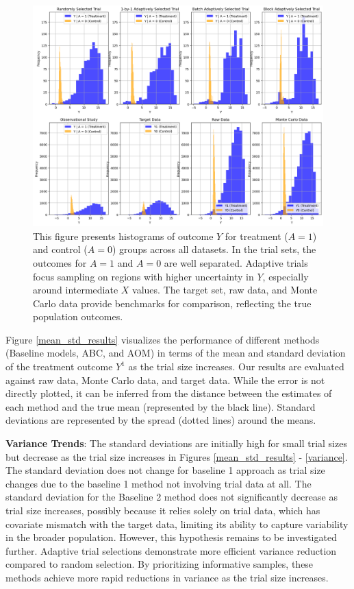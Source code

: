 \documentclass[12pt, oneside]{amsart}
\theoremstyle{definition}
\theoremstyle{remark}
\numberwithin{equation}{section}
\begin{document}
\begin{figure}[hbt!]
    \centering
    \includegraphics[scale=0.3]{Report/Figure/YvsA.jpg}
    \caption{This figure presents histograms of outcome $Y$ for treatment ($A=1$) and control ($A=0$) groups across all datasets. In the trial sets, the outcomes for $A=1$ and $A=0$ are well separated. Adaptive trials focus sampling on regions with higher uncertainty in $Y$, especially around intermediate $X$ values. The target set, raw data, and Monte Carlo data provide benchmarks for comparison, reflecting the true population outcomes.}
    \label{YvsA}
\end{figure}
\FloatBarrier

Figure \ref{mean_std_results} visualizes the performance of different methods (Baseline models, ABC, and AOM) in terms of the mean and standard deviation of the treatment outcome $Y^1$ as the trial size increases. Our results are evaluated against raw data, Monte Carlo data, and target data. While the error is not directly plotted, it can be inferred from the distance between the estimates of each method and the true mean (represented by the black line). Standard deviations are represented by the spread (dotted lines) around the means. 

\textbf{Variance Trends}: The standard deviations are initially high for small trial sizes but decrease as the trial size increases in Figures \ref{mean_std_results} - \ref{variance}. The standard deviation does not change for baseline 1 approach as trial size changes due to the baseline 1 method not involving trial data at all. The standard deviation for the Baseline 2 method does not significantly decrease as trial size increases, possibly because it relies solely on trial data, which has covariate mismatch with the target data, limiting its ability to capture variability in the broader population. However, this hypothesis remains to be investigated further. Adaptive trial selections demonstrate more efficient variance reduction compared to random selection. By prioritizing informative samples, these methods achieve more rapid reductions in variance as the trial size increases. 
\end{document}
